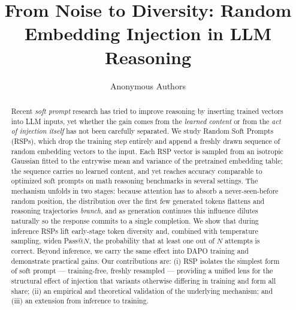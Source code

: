 \documentclass{article}
\title{From Noise to Diversity: Random Embedding Injection in LLM Reasoning}
\author{%
  Anonymous Authors
}
\begin{document}
\maketitle

\begin{abstract}
Recent \textit{soft prompt} research has tried to improve reasoning by inserting trained vectors into LLM inputs, yet whether the gain comes from the \emph{learned content} or from the \emph{act of injection itself} has not been carefully separated. We study Random Soft Prompts (RSPs), which drop the training step entirely and append a freshly drawn sequence of random embedding vectors to the input. Each RSP vector is sampled from an isotropic Gaussian fitted to the entrywise mean and variance of the pretrained embedding table; the sequence carries no learned content, and yet reaches accuracy comparable to optimized soft prompts on math reasoning benchmarks in several settings. The mechanism unfolds in two stages: because attention has to absorb a never-seen-before random position, the distribution over the first few generated tokens flattens and reasoning trajectories \emph{branch}, and as generation continues this influence dilutes naturally so the response commits to a single completion. We show that during inference RSPs lift early-stage token diversity and, combined with temperature sampling, widen Pass@$N$, the probability that at least one out of $N$ attempts is correct. Beyond inference, we carry the same effect into DAPO training and demonstrate practical gains. Our contributions are: (i) RSP isolates the simplest form of soft prompt --- training-free, freshly resampled --- providing a unified lens for the structural effect of injection that variants otherwise differing in training and form all share; (ii) an empirical and theoretical validation of the underlying mechanism; and (iii) an extension from inference to training.
\end{abstract}








\newpage



\appendix


\newpage

\end{document}
